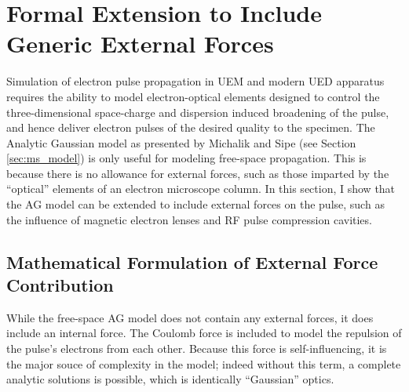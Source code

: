 
\section{Formal Extension to Include Generic External Forces} \label{sec:external_forces}

Simulation of electron pulse propagation in UEM and modern UED apparatus\cite{siwick_ultrafast_2002,oudheusden_electron_2007,reed_femtosecond_2006} requires the ability to model electron-optical elements designed to control the three-dimensional space-charge and dispersion induced broadening of the pulse, and hence deliver electron pulses of the desired quality to the specimen. 
The Analytic Gaussian model as presented by Michalik and Sipe (see Section \ref{sec:ms_model}) is only useful for modeling free-space propagation.
This is because there is no allowance for external forces, such as those imparted by the ``optical'' elements of an electron microscope column.
In this section, I show that the AG model can be extended to include external forces on the pulse, such as the influence of magnetic electron lenses and RF pulse compression cavities.\cite{oudheusden_electron_2007,veisz_hybrid_2007} 

\subsection{Mathematical Formulation of External Force Contribution}

While the free-space AG model does not contain any external forces, it does include an internal force.
The Coulomb force is included to model the repulsion of the pulse's electrons from each other.
Because this force is self-influencing, it is the major souce of complexity in the model; indeed without this term, a complete analytic solutions is possible, which is identically ``Gaussian'' optics.\cite{michalik_analytic_2006}

